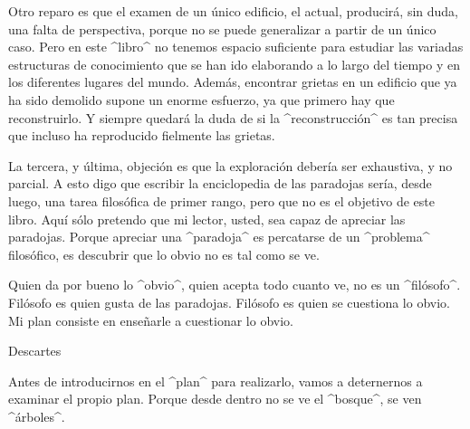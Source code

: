Otro reparo es que el examen de un único edificio, el actual, producirá,
sin duda, una falta de perspectiva, porque no se puede generalizar a
partir de un único caso. Pero en este ^libro^ no tenemos espacio
suficiente para estudiar las variadas estructuras de conocimiento que se
han ido elaborando a lo largo del tiempo y en los diferentes lugares del
mundo. Además, encontrar grietas en un edificio que ya ha sido demolido
supone un enorme esfuerzo, ya que primero hay que reconstruirlo. Y
siempre quedará la duda de si la ^reconstrucción^ es tan precisa que
incluso ha reproducido fielmente las grietas.

La tercera, y última, objeción es que la exploración debería ser
exhaustiva, y no parcial. A esto digo que escribir la enciclopedia de
las paradojas sería, desde luego, una tarea filosófica de primer rango,
pero que no es el objetivo de este libro. Aquí sólo pretendo que mi
lector, usted, sea capaz de apreciar las paradojas. Porque apreciar una
^paradoja^ es percatarse de un ^problema^ filosófico, es descubrir que
lo obvio no es tal como se ve.

Quien da por bueno lo ^obvio^, quien acepta todo cuanto ve, no es un
^filósofo^. Filósofo es quien gusta de las paradojas. Filósofo es quien
se cuestiona lo obvio. Mi plan consiste en enseñarle a cuestionar lo
obvio.


\Section Descartes

Antes de introducirnos en el ^plan^ para realizarlo, vamos a deternernos
a examinar el propio plan. Porque desde dentro no se ve el ^bosque^, se
ven ^árboles^.

